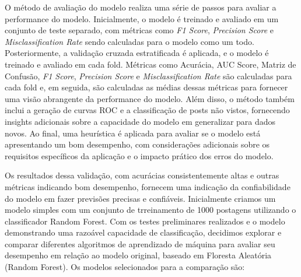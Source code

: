 O método de avaliação do modelo realiza uma série de passos para avaliar a performance do modelo. Inicialmente, o modelo é treinado e avaliado em um conjunto de teste separado, com métricas como \textit{F1 Score}, \textit{Precision Score} e \textit{Misclassification Rate} sendo calculadas para o modelo como um todo. Posteriormente, a validação cruzada estratificada é aplicada, e o modelo é treinado e avaliado em cada fold. Métricas como Acurácia, AUC Score, Matriz de Confusão, \textit{F1 Score}, \textit{Precision Score} e \textit{Misclassification Rate} são calculadas para cada fold e, em seguida, são calculadas as médias dessas métricas para fornecer uma visão abrangente da performance do modelo. Além disso, o método também inclui a geração de curvas ROC e a classificação de posts não vistos, fornecendo insights adicionais sobre a capacidade do modelo em generalizar para dados novos. Ao final, uma heurística é aplicada para avaliar se o modelo está apresentando um bom desempenho, com considerações adicionais sobre os requisitos específicos da aplicação e o impacto prático dos erros do modelo.

Os resultados dessa validação, com acurácias consistentemente altas e outras métricas indicando bom desempenho, fornecem uma indicação da confiabilidade do modelo em fazer previsões precisas e confiáveis. Inicialmente criamos um modelo simples com um conjunto de trreinamento de 1000 postagens utilizando o classificador Random Forest. Com os testes preliminares realizados e o modelo demonstrando uma razoável capacidade de classificação, decidimos explorar e comparar diferentes algoritmos de aprendizado de máquina para avaliar seu desempenho em relação ao modelo original, baseado em Floresta Aleatória (Random Forest). Os modelos selecionados para a comparação são:

